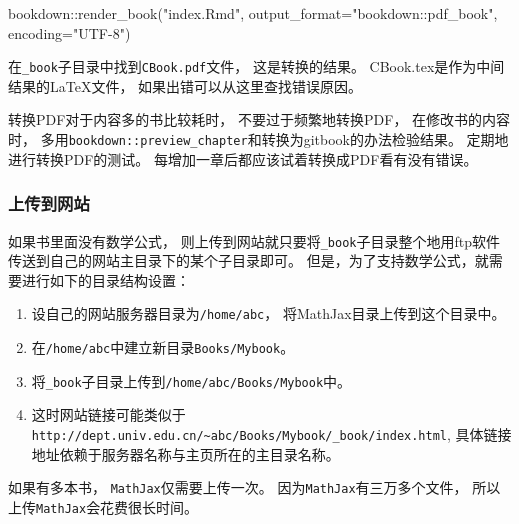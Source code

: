 \documentclass[
]{article}
\newenvironment{Shaded}{\begin{snugshade}}{\end{snugshade}}
\newcommand{\AttributeTok}[1]{\textcolor[rgb]{0.77,0.63,0.00}{#1}}
\newcommand{\FunctionTok}[1]{\textcolor[rgb]{0.00,0.00,0.00}{#1}}
\newcommand{\NormalTok}[1]{#1}
\newcommand{\SpecialCharTok}[1]{\textcolor[rgb]{0.00,0.00,0.00}{#1}}
\newcommand{\StringTok}[1]{\textcolor[rgb]{0.31,0.60,0.02}{#1}}
\providecommand{\tightlist}{%
  \setlength{\itemsep}{0pt}\setlength{\parskip}{0pt}}
\begin{document}
\begin{Shaded}
\begin{Highlighting}[]
\NormalTok{bookdown}\SpecialCharTok{::}\FunctionTok{render\_book}\NormalTok{(}\StringTok{"index.Rmd"}\NormalTok{, }
  \AttributeTok{output\_format=}\StringTok{"bookdown::pdf\_book"}\NormalTok{, }\AttributeTok{encoding=}\StringTok{"UTF{-}8"}\NormalTok{)}
\end{Highlighting}
\end{Shaded}

在\texttt{\_book}子目录中找到\texttt{CBook.pdf}文件，
这是转换的结果。
CBook.tex是作为中间结果的LaTeX文件，
如果出错可以从这里查找错误原因。

转换PDF对于内容多的书比较耗时，
不要过于频繁地转换PDF，
在修改书的内容时，
多用\texttt{bookdown::preview\_chapter}和转换为gitbook的办法检验结果。
定期地进行转换PDF的测试。
每增加一章后都应该试着转换成PDF看有没有错误。

\hypertarget{usage-website}{%
\subsubsection{上传到网站}\label{usage-website}}

如果书里面没有数学公式，
则上传到网站就只要将\texttt{\_book}子目录整个地用ftp软件传送到自己的网站主目录下的某个子目录即可。
但是，为了支持数学公式，就需要进行如下的目录结构设置：

\begin{enumerate}
\def\labelenumi{\arabic{enumi}.}
\tightlist
\item
  设自己的网站服务器目录为\texttt{/home/abc}，
  将MathJax目录上传到这个目录中。
\item
  在\texttt{/home/abc}中建立新目录\texttt{Books/Mybook}。
\item
  将\texttt{\_book}子目录上传到\texttt{/home/abc/Books/Mybook}中。
\item
  这时网站链接可能类似于\texttt{http://dept.univ.edu.cn/\textasciitilde{}abc/Books/Mybook/\_book/index.html},
  具体链接地址依赖于服务器名称与主页所在的主目录名称。
\end{enumerate}

如果有多本书，
\texttt{MathJax}仅需要上传一次。
因为\texttt{MathJax}有三万多个文件，
所以上传\texttt{MathJax}会花费很长时间。

\printbibliography
\end{document}
